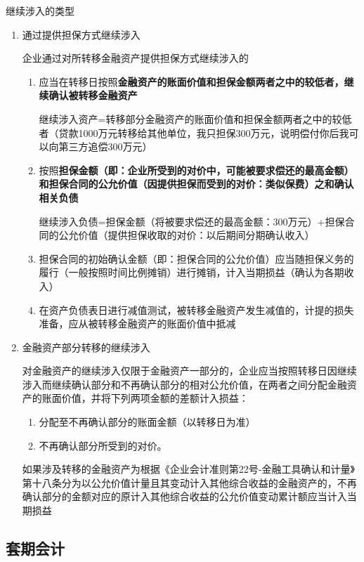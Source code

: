 \documentclass[UTF8,12pt]{ctexart}
\numberwithin{equation}{section} %
\numberwithin{figure}{section}
\numberwithin{table}{section}
\begin{document}
	继续涉入的类型
	\begin{enumerate}
		\item 通过提供担保方式继续涉入
		
		企业通过对所转移金融资产提供担保方式继续涉入的
		\begin{enumerate}
			\item 应当在转移日按照\textbf{金融资产的账面价值和担保金额两者之中的较低者，继续确认被转移金融资产}
			
			继续涉入资产=转移部分金融资产的账面价值和担保金额两者之中的较低者（贷款1000万元转移给其他单位，我只担保300万元，说明偿付你后我可以向第三方追偿300万元）
			
			\item 按照\textbf{担保金额（即：企业所受到的对价中，可能被要求偿还的最高金额）和担保合同的公允价值（因提供担保而受到的对价：类似保费）之和确认相关负债}
			
			继续涉入负债=担保金额（将被要求偿还的最高金额：300万元）+担保合同的公允价值（提供担保收取的对价：以后期间分期确认收入）
			
			\item 担保合同的初始确认金额（即：担保合同的公允价值）应当随担保义务的履行（一般按照时间比例摊销）进行摊销，计入当期损益（确认为各期收入）
			
			\item 在资产负债表日进行减值测试，被转移金融资产发生减值的，计提的损失准备，应从被转移金融资产的账面价值中抵减
		\end{enumerate}
		
		\item 金融资产部分转移的继续涉入
		
		对金融资产的继续涉入仅限于金融资产一部分的，企业应当按照转移日因继续涉入而继续确认部分和不再确认部分的相对公允价值，在两者之间分配金融资产的账面价值，并将下列两项金额的差额计入损益：
		\begin{enumerate}
			\item 分配至不再确认部分的账面金额（以转移日为准）
			
			\item 不再确认部分所受到的对价。
		\end{enumerate}
	
		如果涉及转移的金融资产为根据《企业会计准则第22号-金融工具确认和计量》第十八条分为以公允价值计量且其变动计入其他综合收益的金融资产的，不再确认部分的金额对应的原计入其他综合收益的公允价值变动累计额应当计入当期损益
	\end{enumerate}
	
	\subsection{套期会计}
\end{document}
